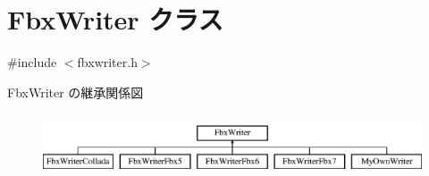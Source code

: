 \hypertarget{class_fbx_writer}{}\section{Fbx\+Writer クラス}
\label{class_fbx_writer}


{\ttfamily \#include $<$fbxwriter.\+h$>$}

Fbx\+Writer の継承関係図\begin{figure}[H]
\begin{center}
\leavevmode
\includegraphics[height=1.898305cm]{class_fbx_writer}
\end{center}
\end{figure}
